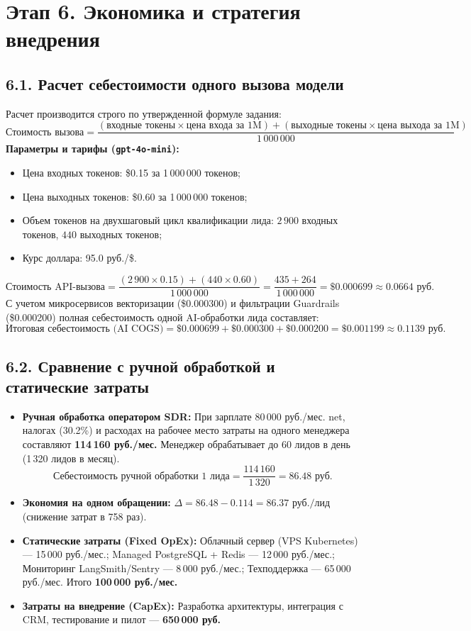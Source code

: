 \documentclass[12pt,a4paper]{article}
\begin{document}
	\section*{Этап 6. Экономика и стратегия внедрения}
	
	\subsection*{6.1. Расчет себестоимости одного вызова модели}
	Расчет производится строго по утвержденной формуле задания:
	$$\text{Стоимость вызова} = \frac{(\text{входные токены} \times \text{цена входа за 1M}) + (\text{выходные токены} \times \text{цена выхода за 1M})}{1\,000\,000}$$
	\textbf{Параметры и тарифы (\texttt{gpt-4o-mini}):}
	\begin{itemize}[noitemsep,topsep=1pt]
		\item Цена входных токенов: \$0.15 за 1\,000\,000 токенов;
		\item Цена выходных токенов: \$0.60 за 1\,000\,000 токенов;
		\item Объем токенов на двухшаговый цикл квалификации лида: $2\,900$ входных токенов, $440$ выходных токенов;
		\item Курс доллара: 95.0 руб./\$.
	\end{itemize}
	$$\text{Стоимость API-вызова} = \frac{(2\,900 \times 0.15) + (440 \times 0.60)}{1\,000\,000} = \frac{435 + 264}{1\,000\,000} = \mathbf{\$0.000699} \approx \mathbf{0.0664\text{ руб.}}$$
	С учетом микросервисов векторизации (\$0.000300) и фильтрации Guardrails (\$0.000200) полная себестоимость одной AI-обработки лида составляет:
	$$\text{Итоговая себестоимость (AI COGS)} = \$0.000699 + \$0.000300 + \$0.000200 = \mathbf{\$0.001199} \approx \mathbf{0.1139\text{ руб.}}$$

	\subsection*{6.2. Сравнение с ручной обработкой и статические затраты}
	\begin{itemize}[noitemsep,topsep=1pt]
		\item \textbf{Ручная обработка оператором SDR:} При зарплате 80\,000 руб./мес. net, налогах (30.2\%) и расходах на рабочее место затраты на одного менеджера составляют \textbf{114\,160 руб./мес.} Менеджер обрабатывает до 60 лидов в день (1\,320 лидов в месяц). 
		$$\text{Себестоимость ручной обработки 1 лида} = \frac{114\,160}{1\,320} = \mathbf{86.48\text{ руб.}}$$
		\item \textbf{Экономия на одном обращении:} $\Delta = 86.48 - 0.114 = \mathbf{86.37\text{ руб./лид}}$ (снижение затрат в 758 раз).
		\item \textbf{Статические затраты (Fixed OpEx):} Облачный сервер (VPS Kubernetes) --- 15\,000 руб./мес.; Managed PostgreSQL + Redis --- 12\,000 руб./мес.; Мониторинг LangSmith/Sentry --- 8\,000 руб./мес.; Техподдержка --- 65\,000 руб./мес. Итого \textbf{100\,000 руб./мес.}
		\item \textbf{Затраты на внедрение (CapEx):} Разработка архитектуры, интеграция с CRM, тестирование и пилот --- \textbf{650\,000 руб.}
	\end{itemize}
\end{document}
